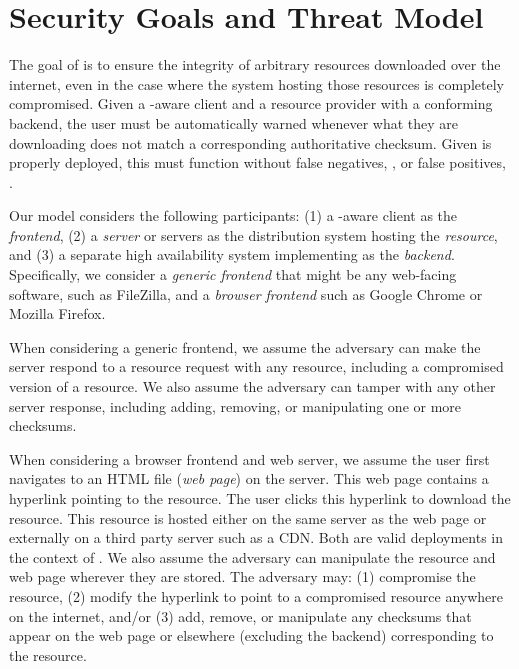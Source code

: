 \section{Security Goals and Threat Model} \label{sec:model}

The goal of \SYSTEM{} is to ensure the integrity of arbitrary resources
downloaded over the internet, even in the case where the system hosting those
resources is completely compromised. Given a \SYSTEM{}-aware client and a
resource provider with a conforming backend, the user must be automatically
warned whenever what they are downloading does not match a corresponding
authoritative checksum. Given \SYSTEM{} is properly deployed, this must function
without false negatives, , or false positives, .

Our model considers the following participants: (1) a \SYSTEM{}-aware client as
the \emph{frontend}, (2) a \emph{server} or servers as the distribution system
hosting the \emph{resource}, and (3) a separate high availability system
implementing \SYSTEM{} as the \emph{backend}. Specifically, we consider a
\emph{generic frontend} that might be any web-facing software, such as
FileZilla, and a \emph{browser frontend} such as Google Chrome or Mozilla
Firefox.

When considering a generic frontend, we assume the adversary can make the server
respond to a resource request with any resource, including a compromised version
of a resource. We also assume the adversary can tamper with any other server
response, including adding, removing, or manipulating one or more checksums.

When considering a browser frontend and web server, we assume the user first
navigates to an HTML file (\emph{web page}) on the server. This web page
contains a hyperlink pointing to the resource. The user clicks this hyperlink to
download the resource. This resource is hosted either on the same server as the
web page or externally on a third party server such as a CDN. Both are valid
deployments in the context of \SYSTEM{}. We also assume the adversary can
manipulate the resource and web page wherever they are stored. The adversary
may: (1) compromise the resource, (2) modify the hyperlink to point to a
compromised resource anywhere on the internet, and/or (3) add, remove, or
manipulate any checksums that appear on the web page or elsewhere (excluding the
backend) corresponding to the resource.

